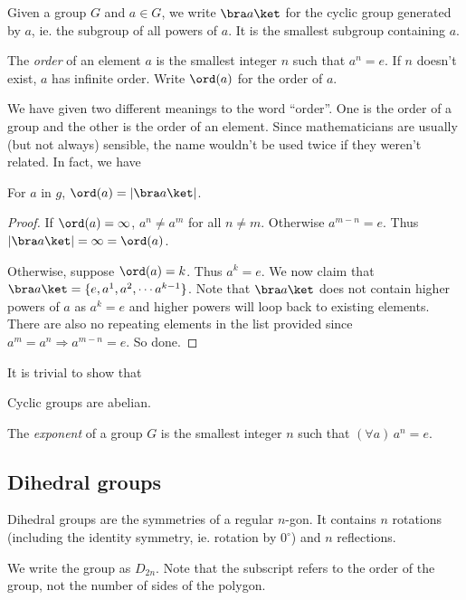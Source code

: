 \documentclass[a4paper]{article}
\begin{document}
\begin{notation}
  Given a group $G$ and $a\in G$, we write $\bra a\ket$ for the cyclic group generated by $a$, ie. the subgroup of all powers of $a$. It is the smallest subgroup containing $a$.
\end{notation}

\begin{defi}
  The \emph{order} of an element $a$ is the smallest integer $n$ such that $a^n = e$. If $n$ doesn't exist, $a$ has infinite order. Write $\ord(a)$ for the order of $a$.
\end{defi}
We have given two different meanings to the word ``order''. One is the order of a group and the other is the order of an element. Since mathematicians are usually (but not always) sensible, the name wouldn't be used twice if they weren't related. In fact, we have

\begin{lemma}
  For $a$ in $g$, $\ord (a) = |\bra a\ket|$.
\end{lemma}
\begin{proof}
  If $\ord (a) = \infty$, $a^n \not= a^m$ for all $n\not= m$. Otherwise $a^{m-n} = e$. Thus $|\bra a\ket| = \infty = \ord (a)$.

  Otherwise, suppose $\ord (a) = k$. Thus $a^k = e$. We now claim that $\bra a\ket = \{e, a^1, a^2, \cdots a^{k-1}\}$. Note that $\bra a\ket$ does not contain higher powers of $a$ as $a^k = e$ and higher powers will loop back to existing elements. There are also no repeating elements in the list provided since $a^m = a^n \Rightarrow a^{m-n} = e$. So done.
\end{proof}

It is trivial to show that
\begin{prop}
  Cyclic groups are abelian.
\end{prop}

\begin{defi}
  The \emph{exponent} of a group $G$ is the smallest integer $n$ such that $(\forall a)\,a^n = e$.
\end{defi}

\subsection{Dihedral groups}
\begin{defi}
  Dihedral groups are the symmetries of a regular $n$-gon. It contains $n$ rotations (including the identity symmetry, ie. rotation by $0^\circ$) and $n$ reflections.

  We write the group as $D_{2n}$. Note that the subscript refers to the order of the group, not the number of sides of the polygon.
\end{defi}
\end{document}
